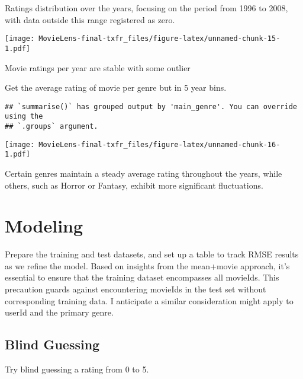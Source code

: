 \documentclass[
]{article}
\newenvironment{Shaded}{\begin{snugshade}}{\end{snugshade}}
\newcommand{\AttributeTok}[1]{\textcolor[rgb]{0.13,0.29,0.53}{#1}}
\newcommand{\CommentTok}[1]{\textcolor[rgb]{0.56,0.35,0.01}{\textit{#1}}}
\newcommand{\ConstantTok}[1]{\textcolor[rgb]{0.56,0.35,0.01}{#1}}
\newcommand{\DecValTok}[1]{\textcolor[rgb]{0.00,0.00,0.81}{#1}}
\newcommand{\FloatTok}[1]{\textcolor[rgb]{0.00,0.00,0.81}{#1}}
\newcommand{\FunctionTok}[1]{\textcolor[rgb]{0.13,0.29,0.53}{\textbf{#1}}}
\newcommand{\NormalTok}[1]{#1}
\newcommand{\OtherTok}[1]{\textcolor[rgb]{0.56,0.35,0.01}{#1}}
\newcommand{\SpecialCharTok}[1]{\textcolor[rgb]{0.81,0.36,0.00}{\textbf{#1}}}
\begin{document}
\newpage

Ratings distribution over the years, focusing on the period from 1996 to
2008, with data outside this range registered as zero.

\texttt{[image: MovieLens-final-txfr\_files/figure-latex/unnamed-chunk-15-1.pdf]}
\newpage

\begin{center} Movie ratings per year are stable with some outlier \end{center}

Get the average rating of movie per genre but in 5 year bins.

\begin{verbatim}
## `summarise()` has grouped output by 'main_genre'. You can override using the
## `.groups` argument.
\end{verbatim}

\texttt{[image: MovieLens-final-txfr\_files/figure-latex/unnamed-chunk-16-1.pdf]}

Certain genres maintain a steady average rating throughout the years,
while others, such as Horror or Fantasy, exhibit more significant
fluctuations.

\newpage

\hypertarget{modeling}{%
\section{Modeling}\label{modeling}}

Prepare the training and test datasets, and set up a table to track RMSE
results as we refine the model. Based on insights from the mean+movie
approach, it's essential to ensure that the training dataset encompasses
all movieIds. This precaution guards against encountering movieIds in
the test set without corresponding training data. I anticipate a similar
consideration might apply to userId and the primary genre.

\hypertarget{blind-guessing}{%
\subsection{Blind Guessing}\label{blind-guessing}}

Try blind guessing a rating from 0 to 5.

\begin{Shaded}
\end{Shaded}
\end{document}
